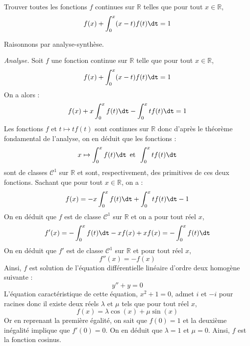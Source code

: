\documentclass[a4paper,10pt]{report}
\begin{document}
\begin{Exa} Trouver toutes les fonctions $f$ continues sur $\mathbb{R}$ telles que pour tout $x \in \mathbb{R}$,
$$ f(x) + \int_{0}^x (x-t)f(t) \dt =1$$
\end{Exa} 

\corr Raisonnons par analyse-synthèse.

\medskip

\noindent \textit{Analyse.} Soit $f$ une fonction continue sur $\mathbb{R}$ telle que pour tout $x \in \mathbb{R}$,
$$ f(x) + \int_{0}^x (x-t)f(t) \dt =1$$
On a alors :
$$ f(x) + x \int_0^x f(t) \dt - \int_0^x t f(t) \dt = 1$$
Les fonctions $f$ et $t \mapsto t f(t)$ sont continues sur $\mathbb{R}$ donc d'après le théorème fondamental de l'analyse, on en déduit que les fonctions :
$$x \mapsto \int_0^x f(t) \dt \, \hbox{ et } \, \int_0^x tf(t) \dt$$ 
sont de classes $\mathcal{C}^1$ sur $\mathbb{R}$ et sont, respectivement, des primitives de ces deux fonctions. Sachant que pour tout $x \in \mathbb{R}$, on a :
$$ f(x) =  -x \int_0^x f(t) \dt + \int_0^x t f(t) \dt - 1$$
On en déduit que $f$ est de classe $\mathcal{C}^1$ sur $\mathbb{R}$ et on a pour tout réel $x$,
$$ f'(x) = - \int_0^x f(t) \dt - xf(x) + xf(x) = - \int_0^x f(t) \dt$$
On en déduit que $f'$ est de classe $\mathcal{C}^1$ sur $\mathbb{R}$ et pour tout réel $x$,
$$ f''(x) = -f(x)$$
Ainsi, $f$ est solution de l'équation différentielle linéaire d'ordre deux homogène suivante :
$$ y''+y=0$$
L'équation caractéristique de cette équation, $x^2+1=0$, admet $i$ et $-i$ pour racines donc il existe deux réels $\lambda$ et $\mu$ tels que pour tout réel $x$,
$$ f(x) = \lambda \cos(x) + \mu \sin(x)$$
Or en reprenant la première égalité, on sait que $f(0)=1$ et la deuxième inégalité implique que $f'(0)=0$. On en déduit que $\lambda=1$ et $\mu=0$. Ainsi, $f$ est la fonction cosinus.

\medskip
\end{document}
